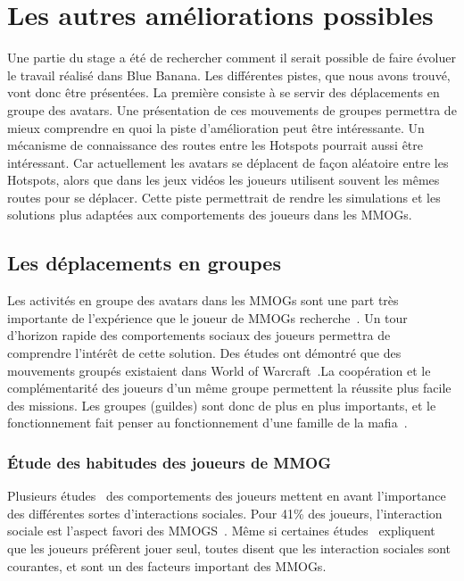 \newpage
\section{Les autres améliorations possibles}

Une partie du stage a été de rechercher comment il serait possible de faire évoluer le travail réalisé dans Blue Banana. Les différentes pistes, que nous avons trouvé, vont donc être présentées. La première consiste à se servir des déplacements en groupe des avatars. Une présentation de ces mouvements de groupes permettra de mieux comprendre en quoi la piste d'amélioration peut être intéressante. Un mécanisme de connaissance des routes entre les Hotspots pourrait aussi être intéressant. Car actuellement les avatars se déplacent de façon aléatoire entre les Hotspots, alors que  dans les jeux vidéos les joueurs utilisent souvent les mêmes routes pour se déplacer. Cette piste permettrait de rendre les simulations et les solutions plus adaptées aux comportements des joueurs dans les MMOGs.

\subsection{Les déplacements en groupes}

Les activités en groupe des avatars dans les MMOGs sont une part très importante de l'expérience que le joueur de MMOGs recherche~\cite{1501834,1255052}. Un tour d'horizon rapide des comportements sociaux des joueurs permettra de comprendre l'intérêt de cette solution. Des études ont démontré que des mouvements groupés existaient dans World of Warcraft~\cite{15141312}.La coopération et le complémentarité des joueurs d'un même groupe permettent la réussite plus facile des missions. Les groupes (guildes) sont donc de plus en plus importants, et le fonctionnement fait penser au fonctionnement d'une famille de la mafia~\cite{Jakobsson03thesopranos}.


\subsubsection{Étude des habitudes des joueurs de MMOG}

Plusieurs études~\cite{BreakingSteretype,1159988,1255052,StudyEQ} des comportements des joueurs mettent en avant l'importance des différentes sortes d'interactions sociales. Pour 41\% des joueurs, l'interaction sociale est l'aspect favori des MMOGS~\cite{BreakingSteretype}. Même si certaines études~\cite{1124834,1031667} expliquent que les joueurs préfèrent jouer seul, toutes disent que les interaction sociales sont courantes, et sont un des facteurs important des MMOGs. 

